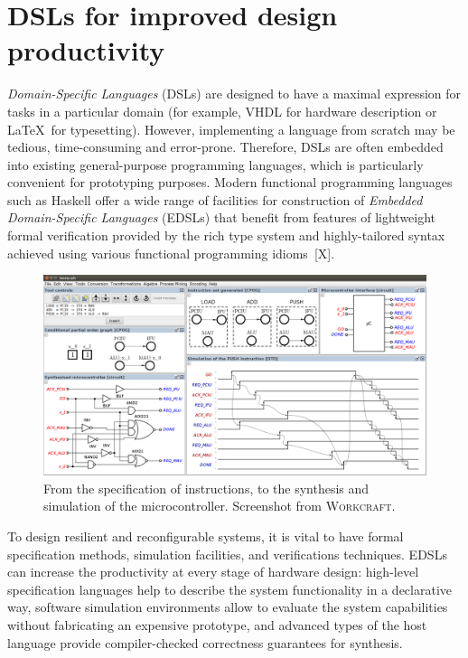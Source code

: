 \documentclass[conference]{IEEEtran}
\begin{document}
\section{DSLs for improved design productivity\label{sec:dsl}}

\emph{Domain-Specific Languages} (DSLs) are designed to have a maximal expression for
tasks in a particular domain (for example, VHDL for hardware description or
\LaTeX~for typesetting). However, implementing a language from scratch may be tedious,
time-consuming and error-prone. Therefore, DSLs are often embedded into existing general-purpose programming languages, which is particularly convenient for
prototyping purposes.
Modern functional programming languages such as Haskell offer a
wide range of facilities for construction of \emph{Embedded Domain-Specific Languages}
(EDSLs) that benefit from features of lightweight formal verification provided by
the rich type system and highly-tailored syntax achieved using various functional
programming idioms~[X].

\begin{figure}[ht!]
\begin{center}
    \includegraphics[width=0.95\linewidth]{FIG/screen.png}
    \vspace{-2mm}
    \caption{From the specification of instructions, to the synthesis and simulation
    of the microcontroller. Screenshot from \textsc{Workcraft}.}
    \label{fig:screenshot}
\end{center}
\vspace{-6mm}
\end{figure}

To design resilient and reconfigurable systems, it is vital to have formal
specification methods, simulation facilities, and verifications techniques.
EDSLs can increase the productivity at every stage of hardware design:
high-level specification
languages help to describe the system functionality in a declarative way, software
simulation environments allow to evaluate the system capabilities
without fabricating an expensive prototype, and advanced types of the host language
provide compiler-checked correctness guarantees for synthesis.
\end{document}
